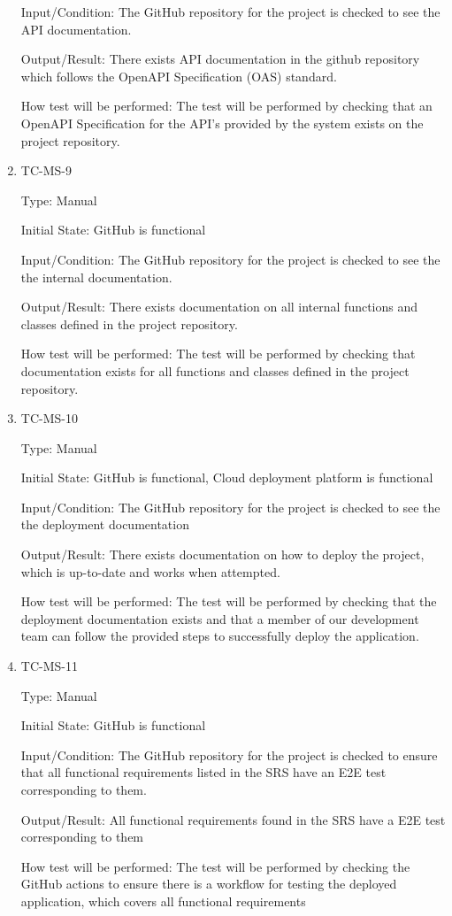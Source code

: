 \documentclass[12pt, titlepage]{article}
\begin{document}
\begin{enumerate}
    Input/Condition: The GitHub repository for the project is checked
    to see the API documentation.

    Output/Result: There exists API documentation in the github
    repository which follows the OpenAPI Specification (OAS) standard.

    How test will be performed: The test will be performed by
    checking that an OpenAPI Specification for the API's provided by
    the system exists on the project repository.

  \item{TC-MS-9\\}

    Type: Manual

    Initial State: GitHub is functional

    Input/Condition: The GitHub repository for the project is checked
    to see the the internal documentation.

    Output/Result: There exists documentation on all internal
    functions and classes defined in the project repository.

    How test will be performed: The test will be performed by
    checking that documentation exists for all functions and classes
    defined in the project repository.

  \item{TC-MS-10\\}

    Type: Manual

    Initial State: GitHub is functional, Cloud deployment platform is functional

    Input/Condition: The GitHub repository for the project is checked
    to see the the deployment documentation

    Output/Result: There exists documentation on how to deploy the
    project, which is up-to-date and works when attempted.

    How test will be performed: The test will be performed by
    checking that the deployment documentation exists and that a
    member of our development team can follow the provided steps to
    successfully deploy the application.

  \item{TC-MS-11\\}

    Type: Manual

    Initial State: GitHub is functional

    Input/Condition: The GitHub repository for the project is checked
    to ensure that all functional requirements listed in the SRS have
    an E2E test corresponding to them.

    Output/Result: All functional requirements found in the SRS have a
    E2E test corresponding to them

    How test will be performed: The test will be performed by
    checking the GitHub actions to ensure there is a workflow for testing
    the deployed application, which covers all functional requirements

\end{enumerate}
\end{document}
